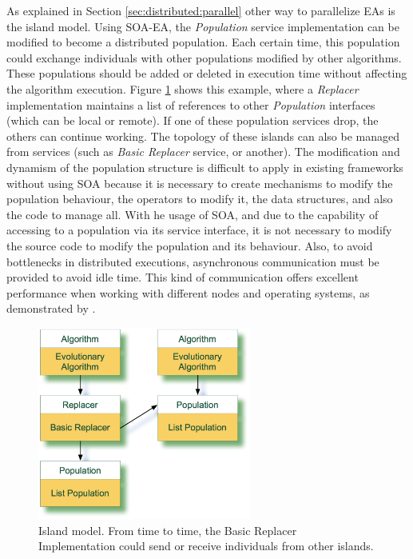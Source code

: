 As explained in Section \ref{sec:distributed:parallel} other way to parallelize EAs is the island model. Using SOA-EA, the {\em Population} service implementation can be modified to become a distributed population. Each certain time, this population could exchange individuals with other populations modified by other algorithms. These populations should be added or deleted in execution time without affecting the algorithm execution. Figure \ref{POPULATION} shows this example, where a {\em Replacer} implementation maintains a list of references to other {\em Population} interfaces (which can be local or remote).  If one of these population services drop, the others can continue working. The topology of these islands can also be managed from services (such as {\em Basic Replacer} service, or another). The  modification and dynamism of the population structure is difficult to apply in existing frameworks without using SOA because it is necessary to create mechanisms to modify the population behaviour, the operators to modify it, the data structures, and also the code to manage all. With he usage of SOA, and due to the capability of accessing to a population via its service interface, it is not necessary to modify the source code to modify the population and its behaviour. Also, to avoid bottlenecks in distributed executions, asynchronous communication must be provided to avoid idle time. This kind of communication offers excellent performance when working with different nodes and operating systems, as demonstrated by \cite{Alba2002Heterogeneous}.



\begin{figure}
\centering
\includegraphics[width=7cm]{gfx/soaea/island.jpg}
\caption{Island model. From time to time, the Basic Replacer Implementation could send or receive individuals from other islands.}
\label{POPULATION}
\end{figure}




